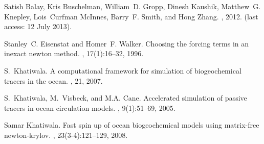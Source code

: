 \begin{thebibliography}{1}

Satish Balay, Kris Buschelman, William~D. Gropp, Dinesh Kaushik, Matthew~G.
  Knepley, Lois~Curfman McInnes, Barry~F. Smith, and Hong Zhang.
, 2012.
 (last access: 12 July 2013).

Stanley~C. Eisenstat and Homer~F. Walker.
\newblock Choosing the forcing terms in an inexact newton method.
, 17(1):16--32, 1996.

S.~Khatiwala.
\newblock A computational framework for simulation of biogeochemical tracers in
  the ocean.
, 21, 2007.

S.~Khatiwala, M.~Visbeck, and M.A. Cane.
\newblock Accelerated simulation of passive tracers in ocean circulation
  models.
, 9(1):51--69, 2005.

Samar Khatiwala.
\newblock Fast spin up of ocean biogeochemical models using matrix-free
  newton-krylov.
, 23(3-4):121--129, 2008.

\end{thebibliography}
